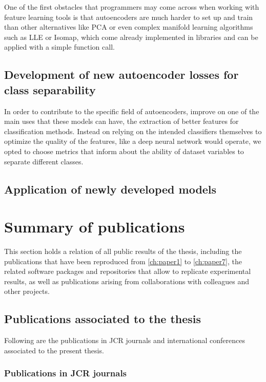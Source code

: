 One of the first obstacles that programmers may come across when working with feature learning tools is that autoencoders are much harder to set up and train than other alternatives like PCA or even complex manifold learning algorithms such as LLE or Isomap, which come already implemented in libraries and can be applied with a simple function call.


\subsection{Development of new autoencoder losses for class separability}

In order to contribute to the specific field of autoencoders,  improve on one of the main uses that these models can have, the extraction of better features for classification methods. Instead on relying on the intended classifiers themselves to optimize the quality of the features, like a deep neural network would operate, we opted to choose metrics that inform about the ability of dataset variables to separate different classes.



\subsection{Application of newly developed models}



\section{Summary of publications}

This section holds a relation of all public results of the thesis, including the publications that have been reproduced from \autoref{ch:paper1} to \autoref{ch:paper7}, the related software packages and repositories that allow to replicate experimental results, as well as publications arising from collaborations with colleagues and other projects.

\subsection{Publications associated to the thesis}

Following are the publications in JCR journals and international conferences associated to the present thesis.

\subsubsection{Publications in JCR journals}

